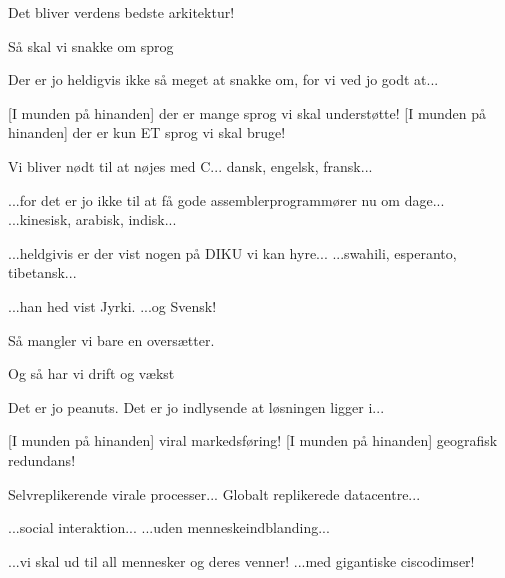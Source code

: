 \documentclass[a4paper,11pt]{article}
\begin{document}
\begin{sketch}
 Det bliver verdens bedste arkitektur!


 Så skal vi snakke om sprog


 Der er jo heldigvis ikke så meget at snakke om, for vi ved jo godt at...

[I munden på hinanden] der er mange sprog vi skal understøtte!
[I munden på hinanden] der er kun ET sprog vi skal bruge!


 Vi bliver nødt til at nøjes med C...
 dansk, engelsk, fransk...

 ...for det er jo ikke til at få gode assemblerprogrammører nu om dage...
 ...kinesisk, arabisk, indisk...

 ...heldgivis er der vist nogen på DIKU vi kan hyre...
 ...swahili, esperanto, tibetansk...

 ...han hed vist Jyrki.
 ...og Svensk!


 Så mangler vi bare en oversætter.







 Og så har vi drift og vækst

 Det er jo peanuts. Det er jo indlysende at løsningen ligger i...

[I munden på hinanden] viral markedsføring!
[I munden på hinanden] geografisk redundans!


 Selvreplikerende virale processer...
 Globalt replikerede datacentre...

 ...social interaktion...
 ...uden menneskeindblanding...

 ...vi skal ud til all mennesker og deres venner!
 ...med gigantiske ciscodimser!


\end{sketch}
\end{document}
